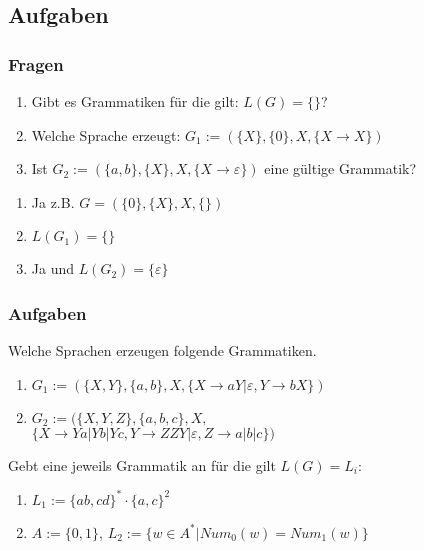 \subsection{Aufgaben}
\begin{frame}
  \frametitle{Fragen}
  \begin{exampleblock}{}
    \begin{enumerate}
      \item Gibt es Grammatiken für die gilt: $L(G) = \{\}$?
      \item Welche Sprache erzeugt: $G_1 := (\{X\}, \{0\}, X, \{X \longrightarrow X\})$
      \item Ist $G_2 := (\{a, b\}, \{X\}, X, \{X \longrightarrow \varepsilon\})$ eine gültige Grammatik?
    \end{enumerate}
  \end{exampleblock}
  \begin{exampleblock}{}
    \begin{enumerate}
      \pause
      \item Ja z.B. $G = (\{0\}, \{X\}, X, \{\})$
      \pause
      \item $L(G_1) = \{\}$
      \pause
      \item Ja und $L(G_2) = \{\varepsilon\}$
    \end{enumerate}
  \end{exampleblock}
\end{frame}
\begin{frame}
  \frametitle{Aufgaben}
  \begin{exampleblock}{Welche Sprachen erzeugen folgende Grammatiken.}
    \begin{enumerate}
      \item $G_1 := (\{X, Y\}, \{a, b\}, X, \{X \longrightarrow aY | \varepsilon, Y \longrightarrow bX\})$
      \item $G_2 := (\{X, Y, Z\}, \{a, b, c\}, X,$\\
             $\{X \longrightarrow Ya | Yb | Yc, Y \longrightarrow ZZY | \varepsilon, Z \longrightarrow a | b | c\})$
    \end{enumerate}
  \end{exampleblock}
  \begin{exampleblock}{Gebt eine jeweils Grammatik an für die gilt $L(G) = L_i$:}
        \begin{enumerate}
      \item $L_1 := \{ab, cd\}^* \cdot \{a, c\}^2$
      \item $A := \{0, 1\}$, $L_2 := \{w  \in A^*| Num_0(w) = Num_1(w)\}$
    \end{enumerate}
  \end{exampleblock}
\end{frame}
